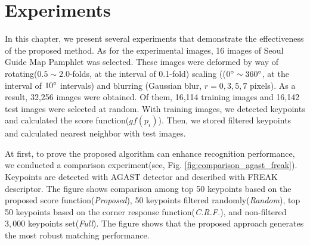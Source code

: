 

\section{Experiments}



In this chapter, we present several experiments that demonstrate the effectiveness of the proposed method. As for the experimental images, 16 images of Seoul Guide Map Pamphlet was selected. These images were deformed by way of rotating($0.5\sim2.0$-folds, at the interval of 0.1-fold) scaling (($0\degree\sim360\degree$, at the interval of $10\degree$ intervals) and blurring (Gaussian blur, $r = 0,3,5,7$ pixels). As a result, 32,256 images were obtained. Of them, 16,114 training images and 16,142 test images were selected at random. With training images, we detected keypoints and calculated the score function($gf(p_i)$). Then, we stored filtered keypoints and calculated nearest neighbor with test images.

At first, to prove the proposed algorithm can enhance recognition performance, we conducted a comparison experiment(see, Fig. \ref{fig:comparison_agast_freak}). Keypoints are detected with AGAST\cite{mair_adaptive_2010} detector and described with FREAK\cite{alahi_freak:_2012} descriptor. The figure shows comparison among top 50 keypoints based on the proposed score function(\textit{Proposed}), 50 keypoints filtered randomly(\textit{Random}), top 50 keypoints based on the corner response function(\textit{C.R.F.}), and non-filtered $3,000$ keypoints set(\textit{Full}). The figure shows that the proposed approach generates the most robust matching performance.

